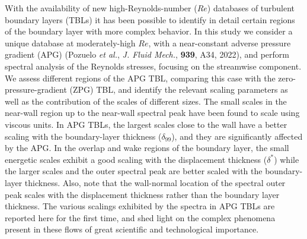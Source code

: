 \begin{paper}

\makepapertitle

%
\begin{paperabstract}
	With the availability of new high-Reynolds-number ($Re$) databases of turbulent boundary layers (TBLs) it has been possible to identify in detail certain regions of the boundary layer with 
more complex behavior. In this study we consider a unique database at moderately-high $Re$, with a near-constant adverse pressure gradient (APG) (Pozuelo {\it et al.}, {\it J. Fluid Mech.}, {\bf 939}, A34, 2022), and perform spectral analysis of the Reynolds stresses, focusing on the streamwise component. We assess different regions of the APG TBL, comparing this case with the zero-pressure-gradient (ZPG) TBL, and identify the relevant scaling parameters as well as the contribution of the scales of different sizes. 
The small scales in the near-wall region up to the near-wall spectral peak have been found to scale using viscous units.
In APG TBLs, the largest scales close to the wall have a better scaling with the boundary-layer thickness ($\delta_{99}$), and they are significantly affected by the APG.
In the overlap and wake regions of the boundary layer, the small energetic scales exhibit a good scaling with the displacement thickness ($\delta^*$) while the larger scales and the outer spectral peak are better scaled with the boundary-layer thickness. Also, note that the wall-normal location of the spectral outer peak scales with the displacement thickness rather than the boundary layer thickness. The various scalings exhibited by the spectra in APG TBLs are reported here for the first time, and shed light on the complex phenomena present in these flows of great scientific and technological importance.
\end{paperabstract}


%



%


%

\end{paper}
